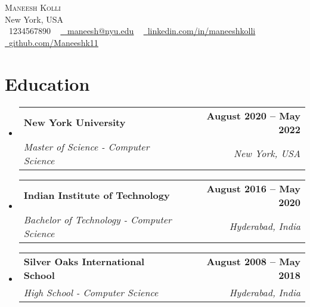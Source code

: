 \documentclass[letterpaper,11pt]{article}
\makeatletter
\newcommand{\resumeSubheading}[4]{
  \vspace{-2pt}\item
    \begin{tabular*}{1.0\textwidth}[t]{l@{\extracolsep{\fill}}r}
      \textbf{#1} & \textbf{\small #2} \\
      \textit{\small#3} & \textit{\small #4} \\
    \end{tabular*}\vspace{-7pt}
}
\newcommand{\resumeSubHeadingListStart}{\begin{itemize}[leftmargin=0.0in, label={}]}
\newcommand{\resumeSubHeadingListEnd}{\end{itemize}}
\makeatother
\begin{document}

\begin{center}
    {\Huge \scshape Maneesh Kolli} \\ \vspace{1pt}
    New York, USA \\ \vspace{1pt}
    \small \raisebox{-0.1\height}\faPhone\ 1234567890 ~ \href{mailto:maneesh@nyu.edu}{\raisebox{-0.2\height}\faEnvelope\  \underline{ maneesh@nyu.edu}} ~ 
    \href{https://linkedin.com/in/maneeshkolli/}{\raisebox{-0.2\height}\faLinkedin\ \underline{linkedin.com/in/maneeshkolli}}  ~
    \href{https://github.com/Maneeshk11}{\raisebox{-0.2\height}\faGithub\ \underline{github.com/Maneeshk11}}
    \vspace{-8pt}
\end{center}


\section{Education}
  \resumeSubHeadingListStart
    \resumeSubheading
      { New York University }{ August 2020 -- May 2022 }
      { Master of Science - Computer Science }{ New York, USA }
    \resumeSubheading
      { Indian Institute of Technology }{ August 2016 -- May 2020 }
      { Bachelor of Technology - Computer Science }{ Hyderabad, India }
    \resumeSubheading
      { Silver Oaks International School }{ August 2008 -- May 2018 }
      { High School - Computer Science }{ Hyderabad, India }
  \resumeSubHeadingListEnd

\end{document}
